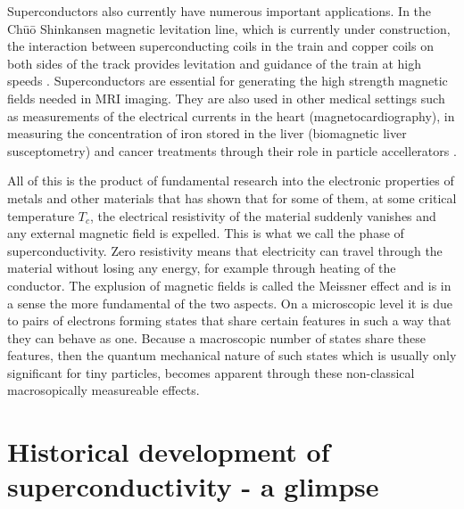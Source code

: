 Superconductors also currently have numerous important applications. In the Ch\=u\=o Shinkansen magnetic levitation line, which is currently
under construction, the interaction between superconducting coils in the train and copper coils on both sides of the track provides levitation and
guidance of the train at high speeds \cite{Bernstein20}. Superconductors are essential for generating the high strength magnetic fields needed
in MRI imaging. They are also used in other medical settings such as measurements of the electrical currents in the heart (magnetocardiography),
in measuring the concentration of iron stored in the liver (biomagnetic liver susceptometry) and cancer treatments through their role in 
particle accellerators \cite{Alonso12}.

All of this is the product of fundamental research into the electronic properties of metals and other materials that has shown that for some
of them, at some critical temperature $T_c$, the electrical resistivity of the material suddenly vanishes and any external magnetic field is expelled. This
is what we call the phase of superconductivity. Zero resistivity means that electricity can travel through the material without losing any energy, for
example through heating of the conductor. The explusion of magnetic fields is called the Meissner effect and is in a sense the more fundamental
of the two aspects. On a microscopic level it is due to pairs of electrons forming states that share certain features in such a way that they
can behave as one. Because a macroscopic number of states share these features, then the quantum mechanical nature of such states which is usually
only significant for tiny particles, becomes apparent through these non-classical macrosopically measureable effects.


\section{Historical development of superconductivity - a glimpse}

